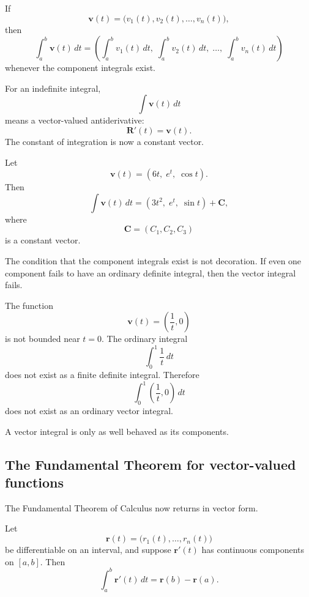 \begin{definition}
If
\[
    \mathbf v(t)=\bigl(v_1(t),v_2(t),\ldots,v_n(t)\bigr),
\]
then
\[
\boxed{
    \int_a^b \mathbf v(t)\,dt
    =
    \left(
        \int_a^b v_1(t)\,dt,\;
        \int_a^b v_2(t)\,dt,\;
        \ldots,\;
        \int_a^b v_n(t)\,dt
    \right)
}
\]
whenever the component integrals exist.
\end{definition}

For an indefinite integral,
\[
    \int \mathbf v(t)\,dt
\]
means a vector-valued antiderivative:
\[
    \mathbf R'(t)=\mathbf v(t).
\]
The constant of integration is now a constant vector.

\begin{example}
Let
\[
    \mathbf v(t)=(6t,\;e^t,\;\cos t).
\]
Then
\[
    \int \mathbf v(t)\,dt
    =
    (3t^2,\;e^t,\;\sin t)+\mathbf C,
\]
where
\[
    \mathbf C=(C_1,C_2,C_3)
\]
is a constant vector.
\end{example}

The condition that the component integrals exist is not decoration.  If even one
component fails to have an ordinary definite integral, then the vector integral fails.

\begin{example}
The function
\[
    \mathbf v(t)=\left(\frac1t,0\right)
\]
is not bounded near \(t=0\).  The ordinary integral
\[
    \int_0^1 \frac1t\,dt
\]
does not exist as a finite definite integral.  Therefore
\[
    \int_0^1 \left(\frac1t,0\right)\,dt
\]
does not exist as an ordinary vector integral.

A vector integral is only as well behaved as its components.
\end{example}

\subsection{The Fundamental Theorem for vector-valued functions}

The Fundamental Theorem of Calculus now returns in vector form.

\begin{theorem}
Let
\[
    \mathbf r(t)=\bigl(r_1(t),\ldots,r_n(t)\bigr)
\]
be differentiable on an interval, and suppose \(\mathbf r'(t)\) has continuous
components on \([a,b]\).  Then
\[
\boxed{
    \int_a^b \mathbf r'(t)\,dt
    =
    \mathbf r(b)-\mathbf r(a).
}
\]
\end{theorem}

